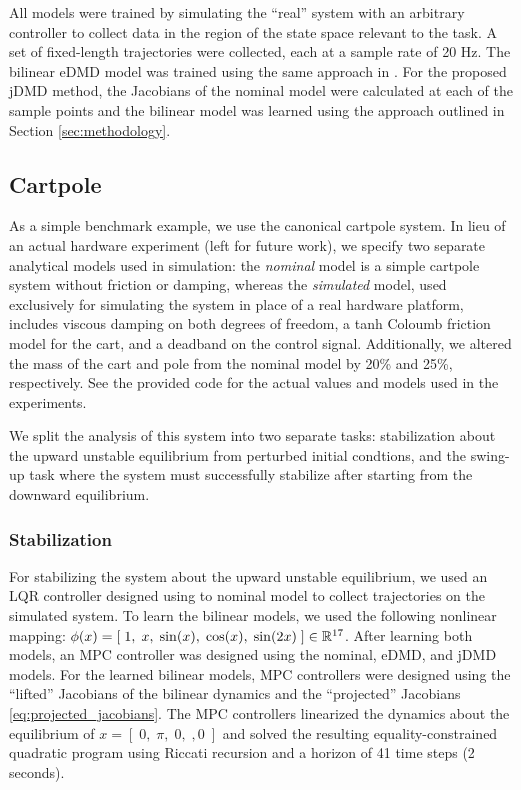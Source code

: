 \documentclass{article}
\begin{document}
All models were trained by simulating the ``real'' system with an arbitrary controller to 
collect data in the region of the state space relevant to the task. A set of fixed-length 
trajectories were collected, each at a sample rate of 20 Hz. The bilinear eDMD model was
trained using the same approach in \cite{Folkestad2021}. For the proposed jDMD method, the
Jacobians of the nominal model were calculated at each of the sample points and the bilinear
model was learned using the approach outlined in Section \ref{sec:methodology}.

\subsection{Cartpole}
As a simple benchmark example, we use the canonical cartpole system. In lieu of an actual 
hardware experiment (left for future work), we specify two separate analytical models used 
in simulation: the \textit{nominal} model is a simple cartpole system without friction or 
damping, whereas the \textit{simulated} model, used exclusively for simulating the system
in place of a real hardware platform, includes viscous damping on both degrees of freedom,
a tanh Coloumb friction model for the cart, and a deadband on the control signal. 
Additionally, we altered the mass of the cart and pole from the nominal model by 20\% and 
25\%, respectively. See the provided code for the actual values and models used in the 
experiments.

We split the analysis of this system into two separate tasks: stabilization about the upward
unstable equilibrium from perturbed initial condtions, and the swing-up task where the 
system must successfully stabilize after starting from the downward equilibrium.

\subsubsection{Stabilization}

For stabilizing the system about the upward unstable equilibrium, we used an LQR controller
designed using to nominal model to collect trajectories on the simulated system.  To learn
the bilinear models, we used the following nonlinear mapping: $\phi(x) = [\; 1,\; x,\;
\sin(x),\; \cos(x),\; \sin(2x)\; ] \in \mathbb{R}^{17}$.  After learning both models, an MPC
controller was designed using the nominal, eDMD, and jDMD models. For the learned bilinear
models, MPC controllers were designed using the ``lifted'' Jacobians of the bilinear 
dynamics and the ``projected'' Jacobians \eqref{eq:projected_jacobians}. The MPC controllers
linearized the dynamics about the equilibrium of $x = [\;0,\; \pi,\; 0,\;, 0\;]$ and solved
the resulting equality-constrained quadratic program using Riccati recursion and a horizon
of 41 time steps (2 seconds). 
\end{document}
